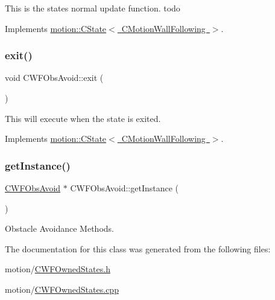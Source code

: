 This is the states normal update function. todo 

Implements \mbox{\hyperlink{classmotion_1_1CState_a71dc72d345b15bf3b5b5bff596a71f33}{motion\+::\+C\+State$<$ C\+Motion\+Wall\+Following $>$}}.

\mbox{\label{classmotion_1_1CWFObsAvoid_af95e36cbc64c2c47fdf5d6ad5dde90a8}} 
\subsubsection{\texorpdfstring{exit()}{exit()}}
{\footnotesize\ttfamily void C\+W\+F\+Obs\+Avoid\+::exit (\begin{DoxyParamCaption}\item[{\mbox{\hyperlink{classmotion_1_1CMotionWallFollowing}{C\+Motion\+Wall\+Following}} $\ast$}]{ }\end{DoxyParamCaption})\hspace{0.3cm}{\ttfamily [virtual]}}

This will execute when the state is exited. 

Implements \mbox{\hyperlink{classmotion_1_1CState_a353db064c159d66b82bf257b35e7c016}{motion\+::\+C\+State$<$ C\+Motion\+Wall\+Following $>$}}.

\mbox{\label{classmotion_1_1CWFObsAvoid_a67a97a1719b8d637a9cf154bd8977171}} 
\subsubsection{\texorpdfstring{get\+Instance()}{getInstance()}}
{\footnotesize\ttfamily \mbox{\hyperlink{classmotion_1_1CWFObsAvoid}{C\+W\+F\+Obs\+Avoid}} $\ast$ C\+W\+F\+Obs\+Avoid\+::get\+Instance (\begin{DoxyParamCaption}\item[{void}]{ }\end{DoxyParamCaption})\hspace{0.3cm}{\ttfamily [static]}}

Obstacle Avoidance Methods. 

The documentation for this class was generated from the following files\+:\begin{DoxyCompactItemize}
\item 
motion/\mbox{\hyperlink{CWFOwnedStates_8h}{C\+W\+F\+Owned\+States.\+h}}\item 
motion/\mbox{\hyperlink{CWFOwnedStates_8cpp}{C\+W\+F\+Owned\+States.\+cpp}}\end{DoxyCompactItemize}
